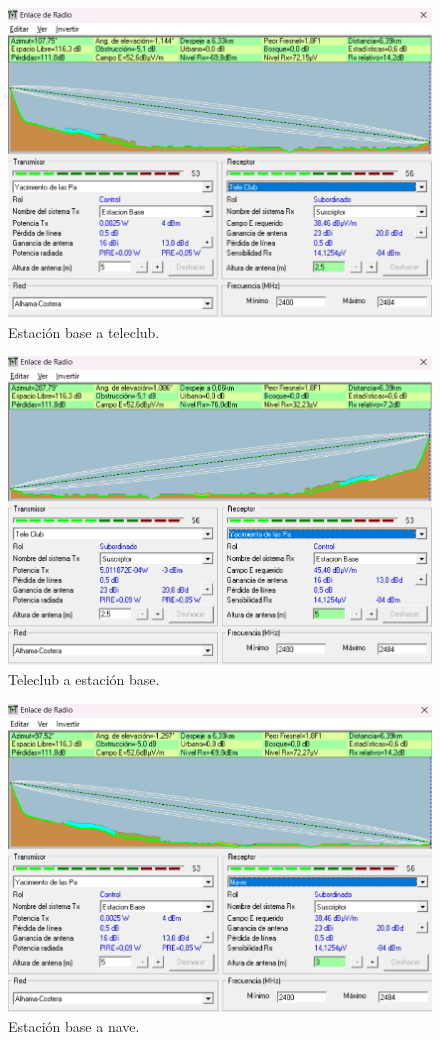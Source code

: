 \documentclass{article}
\begin{document}
\begin{figure}[ht]
    \centering
    \includegraphics[width=0.8\linewidth]{src/EstacionBase-TeleClub.png}
    \caption{\label{fig:ebaseteleclub} Estación base a teleclub.}
\end{figure}

\newpage

\begin{figure}[ht]
    \centering
    \includegraphics[width=0.8\linewidth]{src/TeleClub-EstacionBase.png}
    \caption{\label{fig:teleclubebase} Teleclub a estación base.}
\end{figure}

\begin{figure}[ht]
    \centering
    \includegraphics[width=0.8\linewidth]{src/EstacionBase-Nave.png}
    \caption{\label{fig:ebasenave} Estación base a nave.}
\end{figure}
\newpage
\end{document}
